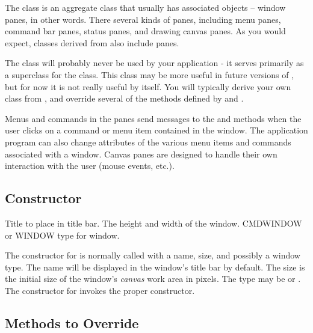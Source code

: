 The  class is an aggregate class that usually has
associated  objects -- window panes, in other
words. There several kinds of panes, including menu panes,
command bar panes, status panes, and drawing canvas panes. As you
would expect, classes derived from  also include
panes.

The  class will probably never be used by your
application - it serves primarily as a superclass for the
 class. This class may be more useful in
future versions of \V, but for now it is not really useful
by itself. You will typically derive your own class from
, and override several of the methods
defined by  and .

Menus and commands in the panes send messages to the 
and  methods when the user clicks on a command
or menu item contained in the window. The application program can
also change attributes of the various menu items and commands
associated with a window. Canvas panes are designed to handle
their own interaction with the user (mouse events, etc.).

\subsection* {Constructor} %

 Title to place in title bar.
 The height and width of the window.
 CMDWINDOW or WINDOW type for window.
\newline
\newline

The constructor for  is normally called with a
name, size, and possibly a window type. The name will be
displayed in the window's title bar by default. The size is the
initial size of the window's \emph{canvas} work area in pixels.
The type may be  or . The constructor
for  invokes the proper  constructor.

\subsection* {Methods to Override} %

